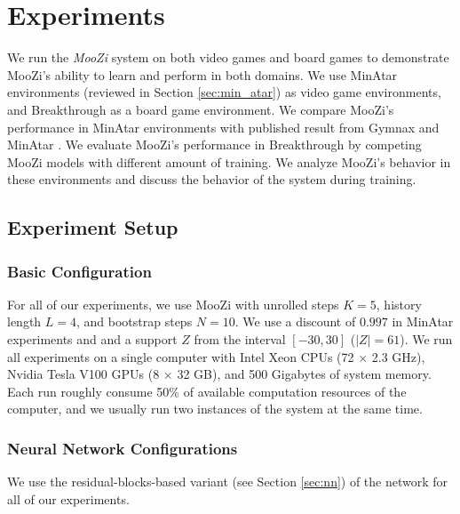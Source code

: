 \chapter{Experiments}
\label{sec:exp}
We run the \textit{MooZi} system on both video games and board games to demonstrate MooZi's ability to learn and perform in both domains.
We use MinAtar environments (reviewed in Section \ref{sec:min_atar}) as video game environments, and Breakthrough as a board game environment.
We compare MooZi's performance in MinAtar environments with published result from Gymnax \cite{GymnaxJAXbasedReinforcement_RobertTjarkoLange_2022} and MinAtar \cite{MinAtarAtariInspiredTestbed_Young.Tian_2019}.
We evaluate MooZi's performance in Breakthrough by competing MooZi models with different amount of training.
We analyze MooZi's behavior in these environments and discuss the behavior of the system during training.

\section{Experiment Setup}
\subsection{Basic Configuration}
For all of our experiments, we use MooZi with unrolled steps $K = 5$, history length $L = 4$, and bootstrap steps $N = 10$.
We use a discount of $0.997$ in MinAtar experiments and  and a support $Z$ from the interval  $[-30, 30]$ ($|Z| = 61$).
We run all experiments on a single computer with Intel Xeon CPUs (72 $\times$ 2.3 GHz), Nvidia Tesla V100 GPUs (8 $\times$ 32 GB), and 500 Gigabytes of system memory.
Each run roughly consume 50\% of available computation resources of the computer, and we usually run two instances of the system at the same time.

\subsection{Neural Network Configurations}
We use the residual-blocks-based variant (see Section \ref{sec:nn}) of the network for all of our experiments.

